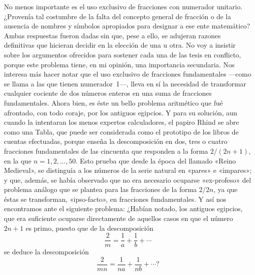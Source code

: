 \documentclass[a4paper, 12pt, draft]{article}
\begin{document}
No menos importante es el uso exclusivo de fracciones con numerador unitario. ¿Provenía tal costumbre de la falta del concepto general de fracción o de la ausencia de nombres y símbolos apropiados para designar a ese ente matemático? Ambas respuestas fueron dadas sin que, pese a ello, se adujeran razones definitivas que hicieran decidir en la elección de una u otra. No voy a insistir sobre los argumentos ofrecidos para sostener cada una
de las tesis en conflicto, porque este problema tiene,
en mi opinión, una importancia secundaria. Nos
interesa más hacer notar que el uso exclusivo de
fracciones fundamentales ---como se llama a las
que tienen \mbox{numerador 1---,} lleva en sí la necesidad
de transformar cualquier cociente de dos números
enteros en una suma de fracciones fundamentales.
Ahora bien, es éste un bello problema aritmético
que fué afrontado, con todo coraje, por los antiguos
egipcios. Y para su solución, aun cuando la intentaran los menos expertos calculadores, el papiro Rhind se abre como una Tabla, que puede ser considerada como el prototipo de los libros de cuentas
efectuadas, porque enseña la descomposición en dos,
tres o cuatro fracciones fundamentales de las cincuenta que responden a la forma $2/(2n + 1)$, en la que $n = 1, 2, \dots , 50$. Esto prueba que desde la época del llamado «Reino Medieval», se distinguía a los números de la serie natural en «pares» e «impares»; y que, además, se había observado que no era necesario ocuparse «ex-profeso» del problema análogo que se plantea para las fracciones de la forma $2/2n$, ya que éstas se transforman, «ipso-facto», en fracciones fundamentales. Y así nos encontramos ante el siguiente problema: ¿Habían notado, los antiguos egipcios, que era suficiente ocuparse directamente de aquellos casos en que el número $2n + 1$ es primo, puesto que de la descomposición
$$
\frac{2}{m}=\frac{1}{a}+\frac{1}{b}+ \cdots
$$
se deduce la descomposición
$$
\frac{2}{mn}=\frac{1}{na}+\frac{1}{nb}+\cdots?
$$
\end{document}
